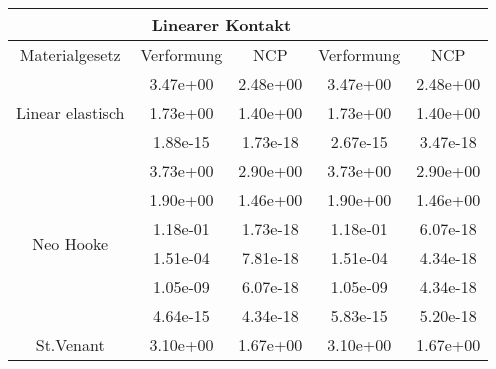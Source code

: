 \begin{table} 
\centering 
\begin{tabular}{c|cc|cc|} 
\cline{2-5} 
 & \multicolumn{2}{|c|}{Linearer Kontakt} &  \\ 
\hline 
\multicolumn{1}{|c|}{Materialgesetz} & \multicolumn{1}{c|}{Verformung} & \multicolumn{1}{c|}{NCP} & \multicolumn{1}{c|}{Verformung} & \multicolumn{1}{c|}{NCP} \\ 
\hline 
\multicolumn{1}{|c|}{\multirow{3}{*}{Linear elastisch}} &\multicolumn{1}{|c|}{  3.47e+00} & \multicolumn{1}{|c|}{  2.48e+00} & \multicolumn{1}{|c|}{  3.47e+00} & \multicolumn{1}{|c|}{  2.48e+00} \\ 
\multicolumn{1}{|c|}{} & \multicolumn{1}{|c|}{  1.73e+00} & \multicolumn{1}{|c|}{  1.40e+00} & \multicolumn{1}{|c|}{  1.73e+00} & \multicolumn{1}{|c|}{  1.40e+00} \\ 
\multicolumn{1}{|c|}{} & \multicolumn{1}{|c|}{  1.88e-15} & \multicolumn{1}{|c|}{  1.73e-18} & \multicolumn{1}{|c|}{  2.67e-15} & \multicolumn{1}{|c|}{  3.47e-18} \\ 
\hline 
\multicolumn{1}{|c|}{\multirow{6}{*}{Neo Hooke}} &\multicolumn{1}{|c|}{  3.73e+00} & \multicolumn{1}{|c|}{  2.90e+00} & \multicolumn{1}{|c|}{  3.73e+00} & \multicolumn{1}{|c|}{  2.90e+00} \\ 
\multicolumn{1}{|c|}{} & \multicolumn{1}{|c|}{  1.90e+00} & \multicolumn{1}{|c|}{  1.46e+00} & \multicolumn{1}{|c|}{  1.90e+00} & \multicolumn{1}{|c|}{  1.46e+00} \\ 
\multicolumn{1}{|c|}{} & \multicolumn{1}{|c|}{  1.18e-01} & \multicolumn{1}{|c|}{  1.73e-18} & \multicolumn{1}{|c|}{  1.18e-01} & \multicolumn{1}{|c|}{  6.07e-18} \\ 
\multicolumn{1}{|c|}{} & \multicolumn{1}{|c|}{  1.51e-04} & \multicolumn{1}{|c|}{  7.81e-18} & \multicolumn{1}{|c|}{  1.51e-04} & \multicolumn{1}{|c|}{  4.34e-18} \\ 
\multicolumn{1}{|c|}{} & \multicolumn{1}{|c|}{  1.05e-09} & \multicolumn{1}{|c|}{  6.07e-18} & \multicolumn{1}{|c|}{  1.05e-09} & \multicolumn{1}{|c|}{  4.34e-18} \\ 
\multicolumn{1}{|c|}{} & \multicolumn{1}{|c|}{  4.64e-15} & \multicolumn{1}{|c|}{  4.34e-18} & \multicolumn{1}{|c|}{  5.83e-15} & \multicolumn{1}{|c|}{  5.20e-18} \\ 
\hline 
\multicolumn{1}{|c|}{\multirow{6}{*}{St.Venant}} &\multicolumn{1}{|c|}{  3.10e+00} & \multicolumn{1}{|c|}{  1.67e+00} & \multicolumn{1}{|c|}{  3.10e+00} & \multicolumn{1}{|c|}{  1.67e+00} \\ 

\end{tabular}
\end{table}
